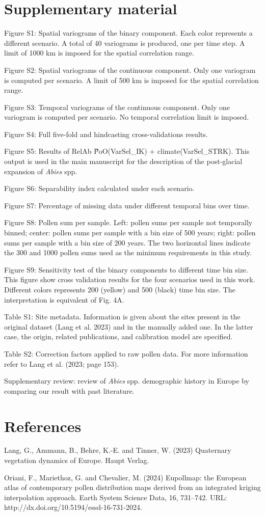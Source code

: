 
\section{Supplementary material}
Figure S1: Spatial variograms of the binary component. Each color represents a different scenario. A total of 40 variograms is produced, one per time step. A limit of 1000 km is imposed for the spatial correlation range.

Figure S2: Spatial variograms of the continuous component. Only one variogram is computed per scenario. A limit of 500 km is imposed for the spatial correlation range.

Figure S3: Temporal variograms of the continuous component. Only one variogram is computed per scenario. No temporal correlation limit is imposed.

Figure S4: Full five-fold and hindcasting cross-validations results. 

Figure S5: Results of RelAb \~ PoO(VarSel\_IK) + climate(VarSel\_STRK). This output is used in the main manuscript for the description of the post-glacial expansion of \textit{Abies} spp. 

Figure S6: Separability index calculated under each scenario.

Figure S7: Percentage of missing data under different temporal bins over time. 

Figure S8: Pollen sum per sample. Left: pollen sums per sample not temporally binned; center: pollen sums per sample with a bin size of 500 years; right: pollen sums per sample with a bin size of 200 years. The two horizontal lines indicate the 300 and 1000 pollen sums used as the minimum requirements in this study. 

Figure S9: Sensitivity test of the binary components to different time bin size. This figure show cross validation results for the four scenarios used in this work. Different colors represents 200 (yellow) and 500 (black) time bin size. The interpretation is equivalent of Fig. 4A.

Table S1: Site metadata. Information is given about the sites present in the original dataset (Lang et al. 2023) and in the manually added one. In the latter case, the origin, related publications, and calibration model are specified.

Table S2: Correction factors applied to raw pollen data. For more information refer to Lang et al. (2023; page 153).

Supplementary review: review of \textit{Abies} spp. demographic history in Europe by comparing our result with past literature. 

\section{References}

Lang, G., Ammann, B., Behre, K.-E. and Tinner, W. (2023) Quaternary vegetation dynamics of Europe. Haupt Verlag.

Oriani, F., Mariethoz, G. and Chevalier, M. (2024) Eupollmap: the European atlas of contemporary pollen distribution maps derived from an integrated kriging interpolation approach. Earth System Science Data, 16, 731–742. URL: http://dx.doi.org/10.5194/essd-16-731-2024.
